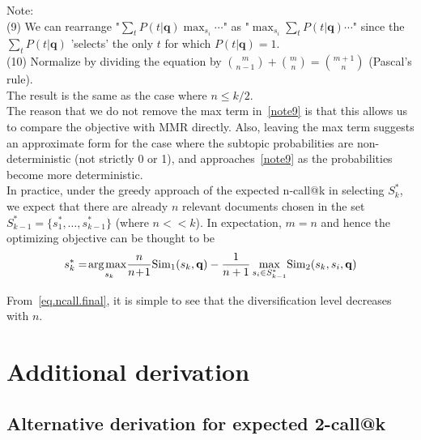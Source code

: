 \documentclass[a4paper]{article}
\renewcommand{\vec}[1]{\mathbf{#1}}
\newcommand{\Sim}{\mathrm{Sim}}
\def\argmax{\operatornamewithlimits{\!arg \;\! max\,}}
\begin{document}
\noindent
Note: \\
(9) We can rearrange "$\sum_t P(t|\vec{q}) \max_{s_i} \cdots$" as "$\max_{s_i} \sum_t P(t|\vec{q}) \cdots$" since the $\sum_t P(t|\vec{q})$ 'selects' the only $t$ for which $P(t|\vec{q}) = 1$. \\
(10) Normalize by dividing the equation by $\binom{m}{n-1} + \binom{m}{n} = \binom{m+1}{n}$ (Pascal's rule). \\
The result is the same as the case where $n \leq k/2$. \\

The reason that we do not remove the max term in~\eqref{note9} is that this allows us to compare the objective with MMR directly. Also, leaving the max term suggests an approximate form for the case where the subtopic probabilities are non-deterministic (not strictly 0 or 1), and approaches~\eqref{note9} as the probabilities become more deterministic. \\

In practice, under the greedy approach of the expected n-call@k in selecting $S_k^*$, we expect that there are already $n$ relevant documents chosen in the set $S_{k-1}^* = \{s_1^*, \dots, s_{k-1}^*\}$ (where $n << k$). In expectation, $m = n$ and hence the optimizing objective can be thought to be
\begin{align}
 s_k^* = \argmax_{s_k} \!\! \frac{n}{n\!+\!1} \Sim_1(s_k,\vec{q}) - \frac{1}{n+1} \max_{s_i \in S_{k-1}^*} \! \Sim_2(s_k,s_i,\vec{q}) \label{eq.ncall.final}
\end{align} 

From~\eqref{eq.ncall.final}, it is simple to see that the diversification level decreases with $n$.

\section{Additional derivation}
\subsection{Alternative derivation for expected 2-call@k}
\end{document}
